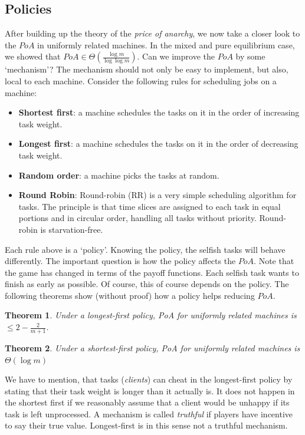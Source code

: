\documentclass[a4paper,11pt]{article}
\newtheorem{theorem}{Theorem}[section]
\begin{document}
\subsection{Policies}
After building up the theory of the \emph{price of anarchy}, we now take a closer look to the $PoA$ in uniformly related machines. In the mixed and pure equilibrium case, we showed that $PoA \in  \Theta\left(\frac{\log m}{\log \log m}\right)$. Can we improve the $PoA$ by some `mechanism'? The mechanism should not only be easy to implement, but also, local to each machine. Consider the following rules for scheduling jobs on a machine:
\begin{itemize}
  \item \textbf{Shortest first}: a machine schedules the tasks on it in the order of increasing task weight.
  \item \textbf{Longest first}: a machine schedules the tasks on it in the order of decreasing task weight.
  \item \textbf{Random order}: a machine picks the tasks at random.
  \item \textbf{Round Robin}\cite{70}: Round-robin (RR) is a very simple scheduling algorithm for tasks. The principle is that time slices are assigned to each task in equal portions and in circular order, handling all tasks without priority. Round-robin is starvation-free.
\end{itemize}
Each rule above is a `policy'. Knowing the policy, the selfish tasks will behave differently. The important question is how the policy affects the $PoA$. Note that the game has changed in terms of the payoff functions. Each selfish task wants to finish as early as possible. Of course, this of course depends on the policy. The following theorems show (without proof) how a policy helps reducing $PoA$.

\begin{theorem} Under a longest-first policy, PoA for uniformly related machines is $\leq 2 - \frac{2}{m+1}$.
\end{theorem}

\begin{theorem} Under a shortest-first policy, PoA for uniformly related machines is $\Theta(\log m)$
\end{theorem}

We have to mention, that tasks (\emph{clients}) can cheat in the longest-first policy by stating that their task weight is longer than it actually is. It does not happen in the shortest first if we reasonably assume that a client would be unhappy if its task is left unprocessed. A mechanism is called \emph{truthful} if players have incentive to say their true value. Longest-first is in this sense not a truthful mechanism.
\end{document}
